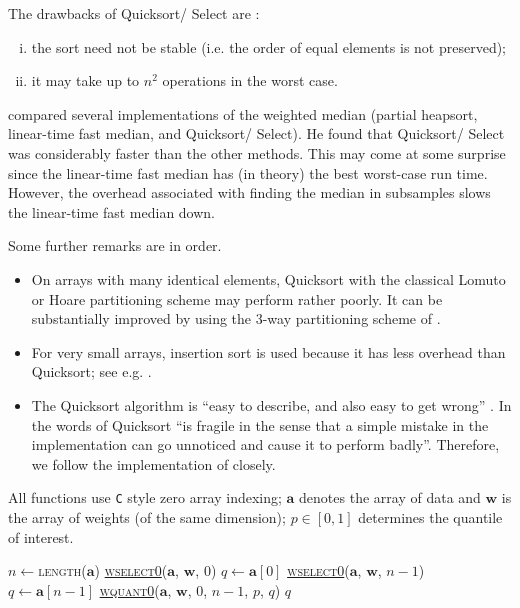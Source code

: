 \documentclass[a4paper,oneside,11pt,DIV=12]{scrartcl}
\newcommand{\code}[1]{{\texttt{#1}}}
\begin{document}
\noindent The drawbacks of Quicksort/ Select are \citep[][p. 303]{sedgewick_1997}:
\begin{enumerate}[i)]
	\item the sort need not be stable (i.e. the order of equal elements is not preserved); 
	\item it may take up to $n^2$ operations in the worst case. 
\end{enumerate}

\citet{gurwitz_1990} compared several implementations of the weighted median (partial heapsort, linear-time fast median, and Quicksort/ Select). He found that Quicksort/ Select was considerably faster than the other methods. This may come at some surprise since the linear-time fast median has (in theory) the best worst-case run time. However, the overhead associated with finding the median in subsamples slows the linear-time fast median down. 

Some further remarks are in order.
\begin{itemize}
	\item On arrays with many identical elements, Quicksort with the classical Lomuto or Hoare partitioning scheme may perform rather poorly. It can be substantially improved by using the 3-way partitioning scheme of \cite{bentley_mcilroy_1993}. 
	\item For very small arrays, insertion sort is used because it has less overhead than Quicksort; see e.g. \cite[][p. 316]{sedgewick_1997}.  
	\item The Quicksort algorithm is ``easy to describe, and also easy to get wrong'' \citep[][p. 1252]{bentley_mcilroy_1993}. In the words of \citet[][p. 303]{sedgewick_1997} Quicksort ``is fragile in the sense that a simple mistake in the implementation can go unnoticed and cause it to perform badly''. Therefore, we follow the implementation of \citet{bentley_mcilroy_1993} closely.
\end{itemize}

\noindent All functions use \code{C} style zero array indexing; $\bm a$ denotes the array of data and $\bm w$ is the array of weights (of the same dimension); $p \in [0,1]$ determines the quantile of interest.  

\begin{algorithmic}[1]
		\State $n \gets$\textsc{length}($\bm a$)
			\State \hyperlink{alg:wselect0}{\textsc{wselect0}}($\bm a$, $\bm w$, $0$)
			\State $q \gets \bm a[0]$
			\State \hyperlink{alg:wselect0}{\textsc{wselect0}}($\bm a$, $\bm w$, $n-1$)
			\State $q \gets \bm a[n-1]$
		\Else
			\State \hyperlink{alg:wquant0}{\textsc{wquant0}}($\bm a$, $\bm w$, $0$, $n-1$, $p$, $q$) 
		\EndIf
		\State \Return $q$
	\EndFunction
\end{algorithmic}
\end{document}

